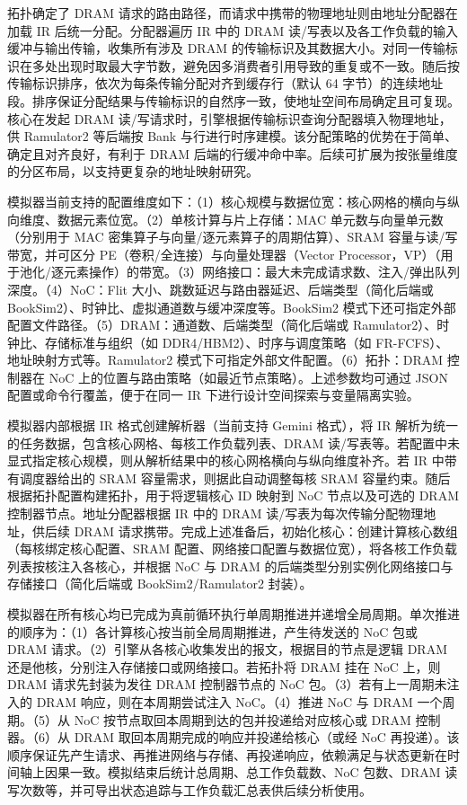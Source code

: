 拓扑确定了 DRAM 请求的路由路径，而请求中携带的物理地址则由地址分配器在加载 IR 后统一分配。分配器遍历 IR 中的 DRAM 读/写表以及各工作负载的输入缓冲与输出传输，收集所有涉及 DRAM 的传输标识及其数据大小。对同一传输标识在多处出现时取最大字节数，避免因多消费者引用导致的重复或不一致。随后按传输标识排序，依次为每条传输分配对齐到缓存行（默认 64 字节）的连续地址段。排序保证分配结果与传输标识的自然序一致，使地址空间布局确定且可复现。核心在发起 DRAM 读/写请求时，引擎根据传输标识查询分配器填入物理地址，供 Ramulator2 等后端按 Bank 与行进行时序建模。该分配策略的优势在于简单、确定且对齐良好，有利于 DRAM 后端的行缓冲命中率。后续可扩展为按张量维度的分区布局，以支持更复杂的地址映射研究。


模拟器当前支持的配置维度如下：（1）核心规模与数据位宽：核心网格的横向与纵向维度、数据元素位宽。（2）单核计算与片上存储：MAC 单元数与向量单元数（分别用于 MAC 密集算子与向量/逐元素算子的周期估算）、SRAM 容量与读/写带宽，并可区分 PE（卷积/全连接）与向量处理器（Vector Processor，VP）（用于池化/逐元素操作）的带宽。（3）网络接口：最大未完成请求数、注入/弹出队列深度。（4）NoC：Flit 大小、跳数延迟与路由器延迟、后端类型（简化后端或 BookSim2）、时钟比、虚拟通道数与缓冲深度等。BookSim2 模式下还可指定外部配置文件路径。（5）DRAM：通道数、后端类型（简化后端或 Ramulator2）、时钟比、存储标准与组织（如 DDR4/HBM2）、时序与调度策略（如 FR-FCFS）、地址映射方式等。Ramulator2 模式下可指定外部文件配置。（6）拓扑：DRAM 控制器在 NoC 上的位置与路由策略（如最近节点策略）。上述参数均可通过 JSON 配置或命令行覆盖，便于在同一 IR 下进行设计空间探索与变量隔离实验。


模拟器内部根据 IR 格式创建解析器（当前支持 Gemini 格式），将 IR 解析为统一的任务数据，包含核心网格、每核工作负载列表、DRAM 读/写表等。若配置中未显式指定核心规模，则从解析结果中的核心网格横向与纵向维度补齐。若 IR 中带有调度器给出的 SRAM 容量需求，则据此自动调整每核 SRAM 容量约束。随后根据拓扑配置构建拓扑，用于将逻辑核心 ID 映射到 NoC 节点以及可选的 DRAM 控制器节点。地址分配器根据 IR 中的 DRAM 读/写表为每次传输分配物理地址，供后续 DRAM 请求携带。完成上述准备后，初始化核心：创建计算核心数组（每核绑定核心配置、SRAM 配置、网络接口配置与数据位宽），将各核工作负载列表按核注入各核心，并根据 NoC 与 DRAM 的后端类型分别实例化网络接口与存储接口（简化后端或 BookSim2/Ramulator2 封装）。

模拟器在所有核心均已完成为真前循环执行单周期推进并递增全局周期。单次推进的顺序为：（1）各计算核心按当前全局周期推进，产生待发送的 NoC 包或 DRAM 请求。（2）引擎从各核心收集发出的报文，根据目的节点是逻辑 DRAM 还是他核，分别注入存储接口或网络接口。若拓扑将 DRAM 挂在 NoC 上，则 DRAM 请求先封装为发往 DRAM 控制器节点的 NoC 包。（3）若有上一周期未注入的 DRAM 响应，则在本周期尝试注入 NoC。（4）推进 NoC 与 DRAM 一个周期。（5）从 NoC 按节点取回本周期到达的包并投递给对应核心或 DRAM 控制器。（6）从 DRAM 取回本周期完成的响应并投递给核心（或经 NoC 再投递）。该顺序保证先产生请求、再推进网络与存储、再投递响应，依赖满足与状态更新在时间轴上因果一致。模拟结束后统计总周期、总工作负载数、NoC 包数、DRAM 读写次数等，并可导出状态追踪与工作负载汇总表供后续分析使用。

